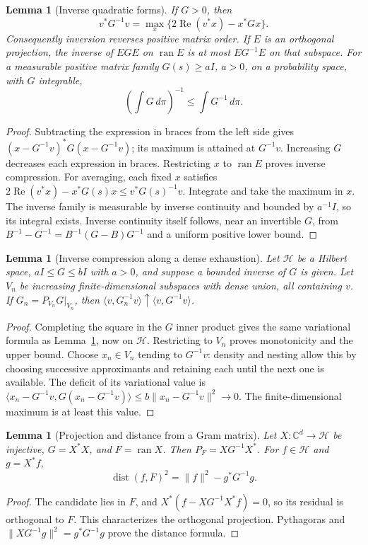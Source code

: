 \documentclass[reqno,a4paper,12pt]{amsart}
\newtheorem{lemma}[theorem]{Lemma}
\theoremstyle{definition}
\newcommand{\C}{\mathbb C}
\newcommand{\ip}[2]{\langle #1,#2\rangle}
\newcommand{\dist}{\operatorname{dist}}
\newcommand{\ran}{\operatorname{ran}}
\begin{document}
\begin{lemma}[Inverse quadratic forms]\label{lem:inverse-variational}
If $G>0$, then
\[
 v^*G^{-1}v=\max_x\{2\operatorname{Re}(v^*x)-x^*Gx\}.
\]
Consequently inversion reverses positive matrix order. If $E$ is an
orthogonal projection, the inverse of $EGE$ on $\ran E$ is at most
$EG^{-1}E$ on that subspace. For a measurable positive matrix family
$G(s)\ge aI$, $a>0$, on a probability space, with $G$ integrable,
\[
 \left(\int G\,d\pi\right)^{-1}\le\int G^{-1}\,d\pi.
\]
\end{lemma}
\begin{proof}
Subtracting the expression in braces from the left side gives
$(x-G^{-1}v)^*G(x-G^{-1}v)$; its maximum is attained at $G^{-1}v$.
Increasing $G$ decreases each expression in braces. Restricting $x$
to $\ran E$ proves inverse compression. For averaging, each fixed $x$
satisfies
$2\operatorname{Re}(v^*x)-x^*G(s)x\le v^*G(s)^{-1}v$.
Integrate and take the maximum in $x$. The inverse family is measurable
by inverse continuity and bounded by $a^{-1}I$, so its integral exists.
Inverse continuity itself follows, near an invertible $G$, from
$B^{-1}-G^{-1}=B^{-1}(G-B)G^{-1}$ and a uniform positive lower bound.
\end{proof}

\begin{lemma}[Inverse compression along a dense exhaustion]
\label{lem:inverse-exhaustion}
Let $\mathcal H$ be a Hilbert space, $aI\le G\le bI$ with $a>0$,
and suppose a bounded inverse of $G$ is given. Let $V_n$ be increasing
finite-dimensional subspaces with dense union, all containing $v$.
If $G_n=P_{V_n}G|_{V_n}$, then
$\ip{v}{G_n^{-1}v}\uparrow\ip{v}{G^{-1}v}$.
\end{lemma}
\begin{proof}
Completing the square in the $G$ inner product gives the same
variational formula as Lemma~\ref{lem:inverse-variational}, now on
$\mathcal H$. Restricting to $V_n$ proves monotonicity and the upper
bound. Choose $x_n\in V_n$ tending to $G^{-1}v$: density and nesting
allow this by choosing successive approximants and retaining each until
the next one is available. The deficit of its variational value is
$\ip{x_n-G^{-1}v}{G(x_n-G^{-1}v)}\le b\|x_n-G^{-1}v\|^2\to0$.
The finite-dimensional maximum is at least this value.
\end{proof}

\begin{lemma}[Projection and distance from a Gram matrix]
\label{lem:gram-projection}
Let $X:\C^d\to\mathcal H$ be injective, $G=X^*X$, and $F=\ran X$.
Then $P_F=XG^{-1}X^*$. For $f\in\mathcal H$ and $g=X^*f$,
\[
 \dist(f,F)^2=\|f\|^2-g^*G^{-1}g.
\]
\end{lemma}
\begin{proof}
The candidate lies in $F$, and
$X^*(f-XG^{-1}X^*f)=0$, so its residual is orthogonal to $F$.
This characterizes the orthogonal projection. Pythagoras and
$\|XG^{-1}g\|^2=g^*G^{-1}g$ prove the distance formula.
\end{proof}
\end{document}
